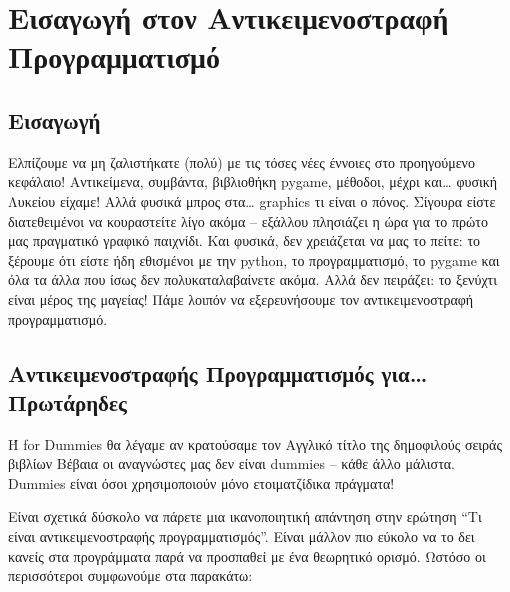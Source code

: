 \chapter{Εισαγωγή στον Αντικειμενοστραφή Προγραμματισμό}
\label{chap:objects-intro}
\section{Εισαγωγή}
Ελπίζουμε να μη ζαλιστήκατε (πολύ) με τις τόσες νέες έννοιες στο προηγούμενο
κεφάλαιο! Αντικείμενα, συμβάντα, βιβλιοθήκη pygame, μέθοδοι, μέχρι
και\ldots{} φυσική Λυκείου είχαμε! Αλλά φυσικά μπρος στα\ldots{} graphics τι είναι ο
πόνος. Σίγουρα είστε διατεθειμένοι να κουραστείτε λίγο ακόμα -- εξάλλου
πλησιάζει η ώρα για το πρώτο μας πραγματικό γραφικό παιχνίδι. Και φυσικά,
δεν χρειάζεται να μας το πείτε: το ξέρουμε ότι είστε ήδη εθισμένοι με την
python, το προγραμματισμό, το pygame και όλα τα άλλα που ίσως δεν
πολυκαταλαβαίνετε ακόμα. Αλλά δεν πειράζει: το ξενύχτι είναι μέρος της
μαγείας! Πάμε λοιπόν να εξερευνήσουμε τον αντικειμενοστραφή
προγραμματισμό.

\section{Αντικειμενοστραφής Προγραμματισμός για\ldots{} Πρωτάρηδες}

Ή for Dummies θα λέγαμε αν κρατούσαμε τον Αγγλικό τίτλο της δημοφιλούς
σειράς βιβλίων Βέβαια οι αναγνώστες μας δεν είναι dummies -- κάθε άλλο
μάλιστα. Dummies είναι όσοι χρησιμοποιούν μόνο ετοιματζίδικα πράγματα!

Είναι σχετικά δύσκολο να πάρετε μια ικανοποιητική απάντηση στην ερώτηση
``Τι είναι αντικειμενοστραφής προγραμματισμός''. Είναι
μάλλον πιο εύκολο να το δει κανείς στα προγράμματα παρά να προσπαθεί με
ένα θεωρητικό ορισμό. Ωστόσο οι περισσότεροι συμφωνούμε στα παρακάτω:

